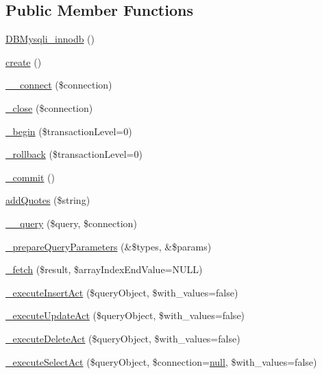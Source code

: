 \subsection*{Public Member Functions}
\begin{DoxyCompactItemize}
\item 
\hyperlink{classDBMysqli__innodb_ac4c325b70a705426271410ca912d1b49}{D\+B\+Mysqli\+\_\+innodb} ()
\item 
\hyperlink{classDBMysqli__innodb_a70756f753a255650d67931f06d675608}{create} ()
\item 
\hyperlink{classDBMysqli__innodb_ab6db4cf73da0e11ed0045a07d751e334}{\+\_\+\+\_\+connect} (\$connection)
\item 
\hyperlink{classDBMysqli__innodb_a566f80a95a8b1e84155feb0868a90c84}{\+\_\+close} (\$connection)
\item 
\hyperlink{classDBMysqli__innodb_aeb782ffae3a856c9b5b5d61e569c84f1}{\+\_\+begin} (\$transaction\+Level=0)
\item 
\hyperlink{classDBMysqli__innodb_a1d9fceb6fa47fd0dce5e2ca05635aafc}{\+\_\+rollback} (\$transaction\+Level=0)
\item 
\hyperlink{classDBMysqli__innodb_a0ec5faa054822bd226fa6c404b17e674}{\+\_\+commit} ()
\item 
\hyperlink{classDBMysqli__innodb_aaf7572b62d23465db5d7bba8930004fc}{add\+Quotes} (\$string)
\item 
\hyperlink{classDBMysqli__innodb_a02098642ca57c84b9061172e8a3b8d17}{\+\_\+\+\_\+query} (\$query, \$connection)
\item 
\hyperlink{classDBMysqli__innodb_a0955069ad72c16d2652573e5883f037d}{\+\_\+prepare\+Query\+Parameters} (\&\$types, \&\$params)
\item 
\hyperlink{classDBMysqli__innodb_ae3c56ef21f1ba07dfd602534544e6fc9}{\+\_\+fetch} (\$result, \$array\+Index\+End\+Value=N\+U\+LL)
\item 
\hyperlink{classDBMysqli__innodb_a7f76f4789d2a6b1614345c4c69071546}{\+\_\+execute\+Insert\+Act} (\$query\+Object, \$with\+\_\+values=false)
\item 
\hyperlink{classDBMysqli__innodb_ad45981920c2258e135292b1ffedaecfb}{\+\_\+execute\+Update\+Act} (\$query\+Object, \$with\+\_\+values=false)
\item 
\hyperlink{classDBMysqli__innodb_a3ba692ef0c7a7d89ba5c7deee0fdd601}{\+\_\+execute\+Delete\+Act} (\$query\+Object, \$with\+\_\+values=false)
\item 
\hyperlink{classDBMysqli__innodb_abae8c007e13d7811697dadb3f9ef3930}{\+\_\+execute\+Select\+Act} (\$query\+Object, \$connection=\hyperlink{modernizr_8min_8js_a286f9ec831c5e676eeb493248eab9575}{null}, \$with\+\_\+values=false)

\end{DoxyCompactItemize}
